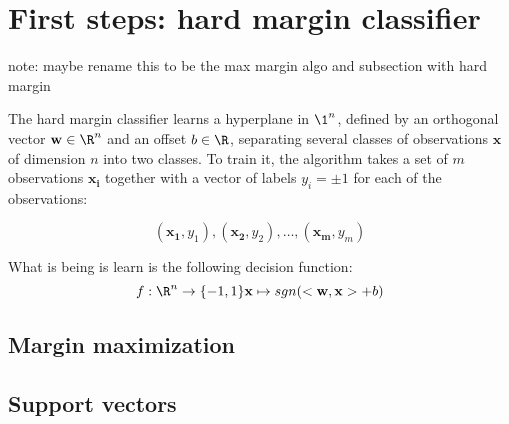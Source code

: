 \section {First steps: hard margin classifier}

note: maybe rename this to be the max margin algo and subsection with hard margin

The hard margin classifier learns a hyperplane in $\1^n$, defined by an orthogonal vector $\mathbf{w} \in \R ^n$ and an offset $b \in \R$, separating several classes of observations $\mathbf{x}$ of dimension $n$ into two classes. To train it, the algorithm takes a set of $m$ observations $\mathbf{x_i}$ together with a vector of labels $y_i = \pm 1$ for each of the observations:

$$
(\mathbf{x_1}, y_1), (\mathbf{x_2}, y_2), \ldots, (\mathbf{x_m}, y_m)
$$

What is being is learn is the following decision function:
$$f : \R ^n \rightarrow \{-1, 1\}
\mathbf{x} \mapsto sgn(<\mathbf{w}, \mathbf{x}> + b)
$$ 

\subsection {Margin maximization}


\subsection {Support vectors}
